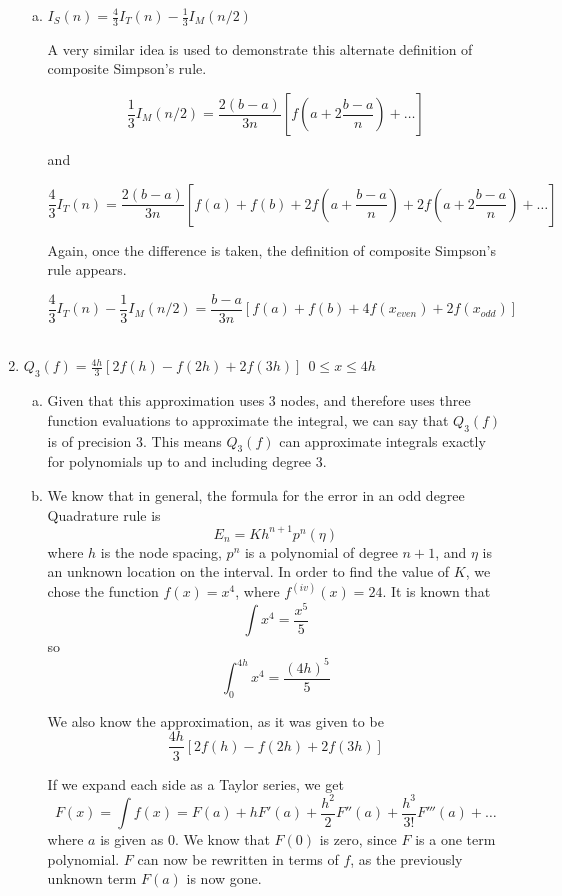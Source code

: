 \documentclass[11pt]{article}
\begin{document}
\begin{enumerate}
\begin{enumerate}[(a)]
	\item $I_S(n) = \frac{4}{3}I_T(n) - \frac{1}{3}I_M(n/2)$

	A very similar idea is used to demonstrate this alternate definition of composite Simpson's rule.

	\[
	\frac{1}{3}I_M(n/2) = \frac{2(b-a)}{3n}[f(a+2\frac{b-a}{n}) + \ldots]
	\]

	and

	\[
	\frac{4}{3}I_T(n) = \frac{2(b-a)}{3n}[f(a) + f(b) + 2f(a+\frac{b-a}{n}) + 2f(a+2\frac{b-a}{n}) + \ldots]
	\]

	Again, once the difference is taken, the definition of composite Simpson's rule appears.

	\[
	\frac{4}{3}I_T(n) - \frac{1}{3}I_M(n/2) = \frac{b-a}{3n}[f(a) + f(b) + 4f(x_{even}) + 2f(x_{odd})]
	\] \

	\end{enumerate}

	\item $Q_3(f) = \frac{4h}{3}[2f(h)-f(2h)+2f(3h)]\ \ 0\leq x \leq 4h$

	\begin{enumerate}[(a)]

	\item Given that this approximation uses 3 nodes, and therefore uses three function evaluations to approximate the integral, we can say that $Q_3(f)$ is of precision $3$. This means $Q_3(f)$ can approximate integrals exactly for polynomials up to and including degree 3. \\

	\item We know that in general, the formula for the error in an odd degree Quadrature rule is
	$$E_n =  Kh^{n+1}p^n(\eta)$$
	where $h$ is the node spacing, $p^n$ is a polynomial of degree $n+1$, and $\eta$ is an unknown location on the interval. In order to find the value of $K$, we chose the function $f(x) = x^4$, where $f^{(iv)}(x) = 24$. It is known that $$\int x^4 = \frac{x^5}{5}$$ so $$\int_{0}^{4h}x^4 = \frac{(4h)^5}{5}$$

	We also know the approximation, as it was given to be
	\[
	\frac{4h}{3}[2f(h)-f(2h)+2f(3h)]
	\]

	If we expand each side as a Taylor series, we get
	\[
	F(x) = \int f(x) = F(a) + hF'(a) + \frac{h^2}{2}F''(a) + \frac{h^3}{3!}F'''(a) + \ldots
	\]
	where $a$ is given as 0. We know that $F(0)$ is zero, since $F$ is a one term polynomial. $F$ can now be rewritten in terms of $f$, as the previously unknown term $F(a)$ is now gone.


\end{enumerate}
\end{enumerate}
\end{document}
